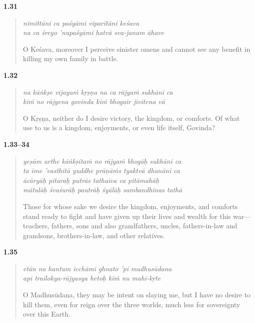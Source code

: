 \par\noindent\textbf{1.31}\par
\begin{verse}
\textit{nimittāni ca paśyāmi viparītāni keśava} \\
\textit{na ca śreyo ’nupaśyāmi hatvā sva-janam āhave}

\noindent O Keśava, moreover I perceive sinister omens and cannot see any benefit in killing my own family in battle.
\end{verse}
\par



\par\noindent\textbf{1.32}\par
\begin{verse}
\textit{na kāṅkṣe vijayaṁ kṛṣṇa na ca rājyaṁ sukhāni ca} \\
\textit{kiṁ no rājyena govinda kiṁ bhogair jīvitena vā}

\noindent O Kṛṣṇa, neither do I desire victory, the kingdom, or comforts. Of what use to us is a kingdom, enjoyments, or even life itself, Govinda?
\end{verse}
\par



\par\noindent\textbf{1.33–34}\par
\begin{verse}
\textit{yeṣām arthe kāṅkṣitaṁ no rājyaṁ bhogāḥ sukhāni ca} \\
\textit{ta ime ’vasthitā yuddhe prāṇāṁs tyaktvā dhanāni ca} \\
\textit{ācāryāḥ pitaraḥ putrās tathaiva ca pitāmahāḥ} \\
\textit{mātulāḥ śvaśurāḥ pautrāḥ śyālāḥ sambandhinas tathā}

\noindent Those for whose sake we desire the kingdom, enjoyments, and comforts stand ready to fight and have given up their lives and wealth for this war---teachers, fathers, sons and also grandfathers, uncles, fathers-in-law and grandsons, brothers-in-law, and other relatives.
\end{verse}
\par



\par\noindent\textbf{1.35}\par
\begin{verse}
\textit{etān na hantum icchāmi ghnato ’pi madhusūdana} \\
\textit{api trailokya-rājyasya hetoḥ kiṁ nu mahī-kṛte}

\noindent O Madhusūdana, they may be intent on slaying me, but I have no desire to kill them, even for reign over the three worlds, much less for sovereignty over this Earth.
\end{verse}
\par



